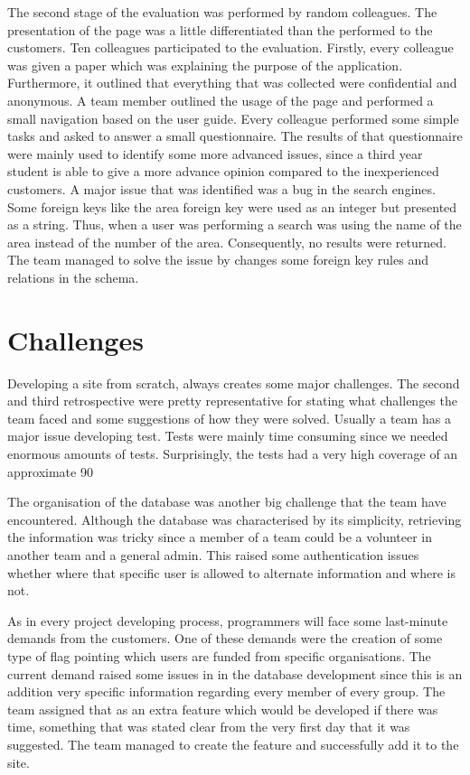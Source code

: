 \documentclass{l3proj}
\begin{document}
The second stage of the evaluation was performed by random colleagues. The presentation of the page was a little differentiated than the performed to the customers. Ten colleagues participated to the evaluation. Firstly, every colleague was given a paper which was explaining the purpose of the application. Furthermore, it outlined that everything that was collected were confidential and anonymous. A team member outlined the usage of the page and performed a small navigation based on the user guide. Every colleague performed some simple tasks and asked to answer a small questionnaire. The results of that questionnaire were mainly used to identify some more advanced issues, since a third year student is able to give a more advance opinion compared to the inexperienced customers. A major issue that was identified was a bug in the search engines. Some foreign keys like the area foreign key were used as an integer but presented as a string. Thus, when a user was performing a search was using the name of the area instead of the number of the area. Consequently, no results were returned. The team managed to solve the issue by changes some foreign key rules and relations in the schema.




\section{Challenges}
\label{challenges}

Developing a site from scratch, always creates some major challenges. The second and third retrospective were pretty representative for stating what challenges the team faced and some suggestions of how they were solved. Usually a team has a major issue developing test. Tests were mainly time consuming since we needed enormous amounts of tests. Surprisingly, the tests had a very high coverage of an approximate 90%

The organisation of the database was another big challenge that the team have encountered. Although the database was characterised by its simplicity, retrieving the information was tricky since a member of a team could be a volunteer in another team and a general admin. This raised some authentication issues whether where that specific user is allowed to alternate information and where is not.

As in every project developing process, programmers will face some last-minute demands from the customers. One of these demands were the creation of some type of flag pointing which users are funded from specific organisations. The current demand raised some issues in in the database development since this is an addition very specific information regarding every member of every group. The team assigned that as an extra feature which would be developed if there was time, something that was stated clear from the very first day that it was suggested. The team managed to create the feature and successfully add it to the site.
\end{document}
